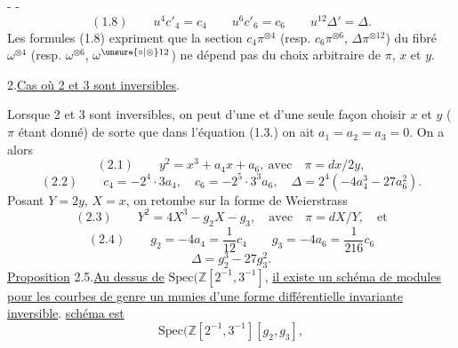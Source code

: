 -  -
\[
(1.8)\qquad u^4c'_4=c_4\qquad u^6c'_6=c_6\qquad u^{12}\Delta'=\Delta.
\]
Les formules (1.8) expriment que la section $c_4\pi^{\otimes4}$ (resp. $c_6\pi^{\otimes6}$,  $\Delta\pi^{\otimes12}$) du fibré $\omega^{\otimes4}$ (resp. $\omega^{\otimes6}$, $\omega^{\unsure{\circ|\otimes}12}$) ne dépend pas du choix arbitraire de $\pi$, $x$ et $y$.

2.\quad \uline{Cas où 2 et 3 sont inversibles}.

Lorsque 2 et 3 sont inversibles, on peut d'une et d'une seule façon choisir $x$ et $y$ ($\pi$ étant donné) de sorte que dans l'équation (1.3.) on ait $a_1=a_2=a_3=0$. On a alors
\[
(2.1)\qquad y^2=x^3+a_4x+a_6,\ \text{avec}\quad\pi=dx/2y,
\]
\[
(2.2)\qquad c_4=-2^4\cdot3a_4,\quad c_6=-2^5\cdot3^3a_6,\quad\Delta=2^4(-4a_4^3-27a_6^2).
\]
Posant $Y=2y$, $X=x$, on retombe sur la forme de Weierstrass
\[
(2.3)\qquad Y^2=4X^3-g_2X-g_3,\quad\text{avec}\quad\pi=dX/Y,\quad\text{et}
\]
\[
(2.4)\qquad g_2=-4a_4=\frac1{12}c_4\qquad g_3=-4a_6=\frac1{216}c_6
\]
\[
\Delta=g_2^3-27g_3^2.
\]
\uline{Proposition} 2.5.\quad \uline{Au dessus de} $\mathrm{Spec}(\mathbb Z[2^{-1},3^{-1}]$, \uline{il existe un schéma de modules pour les courbes de genre un munies d'une forme différentielle invariante inversible}. \uline{ schéma est}
\[
\mathrm{Spec}(\mathbb Z[2^{-1},3^{-1}][g_2,g_3],
\]
